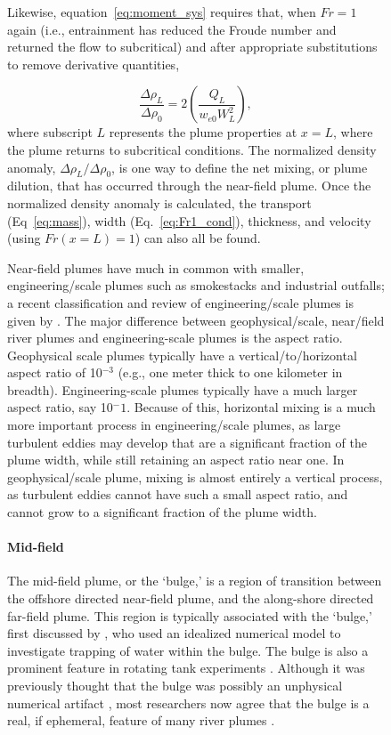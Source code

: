 \documentclass[11pt]{report}
\numberwithin{equation}{section}
\begin{document}
\begin{figure}
Likewise, equation~\ref{eq:moment_sys} requires that, when $Fr=1$ again (i.e., entrainment has reduced the Froude number and returned the flow to subcritical) and after appropriate substitutions to remove derivative quantities,

\begin{equation}
\frac{\Delta \rho_L}{\Delta \rho_0} = 2 \left(\frac{Q_L}{w_{e0} W_L^2}\right),
\label{eq:Fr1_cond}
\end{equation}
where subscript $L$ represents the plume properties at $x=L$, where the plume returns to subcritical conditions.  The normalized density anomaly, ${\Delta \rho_L}/{\Delta \rho_0}$, is one way to define the net mixing, or plume dilution, that has occurred through the near-field plume.  Once the normalized density anomaly is calculated, the transport (Eq~\ref{eq:mass}), width (Eq.~\ref{eq:Fr1_cond}), thickness, and velocity (using $Fr(x=L)=1$) can also all be found.



Near-field plumes have much in common with smaller, engineering\-/scale plumes such as smokestacks and industrial outfalls; a recent classification and review of engineering\-/scale plumes is given by \citet{jones.ea:07}.  The major difference between geophysical\-/scale, near\-/field river plumes and engineering-scale plumes is the aspect ratio.  Geophysical scale plumes typically have a vertical\-/to\-/horizontal aspect ratio of 10$^{-3}$ (e.g.,  one meter thick to one kilometer in breadth).  Engineering-scale plumes typically have a much larger aspect ratio, say 10$^-1$.  Because of this, horizontal mixing is a much more important process in engineering\-/scale plumes, as large turbulent eddies may develop that are a significant fraction of the plume width, while still retaining an aspect ratio near one.  In geophysical\-/scale plume, mixing is almost entirely a vertical process, as turbulent eddies cannot have such a small aspect ratio, and cannot grow to a significant fraction of the plume width.  

\paragraph{Mid-field}

The mid-field plume, or the `bulge,' is a region of transition between the offshore directed near-field plume, and the along-shore directed far-field plume.  This region is typically associated with the `bulge,' first discussed by \citet{fong.geyer:02}, who used an idealized numerical model to investigate trapping of water within the bulge.  The bulge is also a prominent feature in rotating tank experiments \citep{avicola.huq:03a, avicola.huq:03b, horner-devine.ea:06, huq:09}.  Although it was previously thought that the bulge was possibly an unphysical numerical artifact \citep[e.g.,][]{garvine:01}, most researchers now agree that the bulge is a real, if ephemeral, feature of many river plumes \citep[e.g.,][]{chant.ea:08, horner-devine.ea:08, horner-devine:09}.    


\end{figure}
\end{document}
